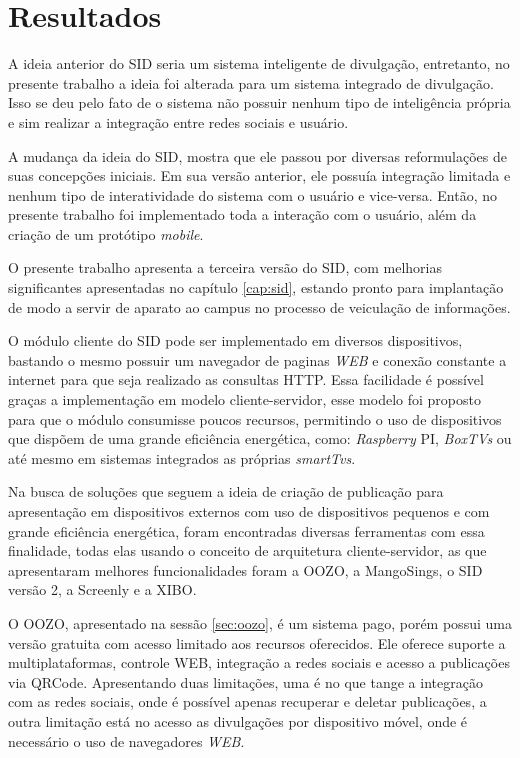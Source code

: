 \chapter[Resultados]{Resultados}
A ideia anterior do SID seria um sistema inteligente de divulgação, entretanto, no presente trabalho a ideia foi alterada para um sistema integrado de divulgação. Isso se deu pelo fato de o sistema não possuir nenhum tipo de inteligência própria e sim realizar a integração entre redes sociais e usuário.

A mudança da ideia do SID, mostra que ele passou por diversas reformulações de suas concepções iniciais. Em sua versão anterior, ele possuía integração limitada e nenhum tipo de interatividade do sistema com o usuário e vice-versa. Então, no presente trabalho foi implementado toda a interação com o usuário, além da criação de um protótipo \textit{mobile}.

O presente trabalho apresenta a terceira versão do SID, com melhorias significantes apresentadas no capítulo \ref{cap:sid}, estando pronto para implantação de modo a servir de aparato ao campus no processo de veiculação de informações.



O módulo cliente do SID pode ser implementado em diversos dispositivos, bastando o mesmo possuir um navegador de paginas \textit{WEB} e conexão constante a internet para que seja realizado as consultas HTTP. Essa facilidade é possível graças a implementação em modelo cliente-servidor, esse modelo foi proposto para que o módulo consumisse poucos recursos, permitindo o uso de dispositivos que dispõem de uma grande eficiência energética, como: \textit{Raspberry} PI, \textit{BoxTVs} ou até mesmo em sistemas integrados as próprias \textit{smartTvs}.


Na busca de soluções que seguem a ideia de criação de publicação para apresentação em dispositivos externos com uso de dispositivos pequenos e com grande eficiência energética, foram encontradas diversas ferramentas com essa finalidade, todas elas usando o conceito de arquitetura cliente-servidor, as que apresentaram melhores funcionalidades foram a OOZO, a MangoSings, o SID versão 2, a Screenly e a XIBO.

O OOZO, apresentado na sessão \ref{sec:oozo}, é um sistema pago, porém possui uma versão gratuita com acesso limitado aos recursos oferecidos. Ele oferece suporte a multiplataformas, controle WEB, integração a redes sociais e acesso a publicações via QRCode. Apresentando duas limitações, uma é no que tange a integração com as redes sociais, onde é possível apenas recuperar e deletar publicações, a outra limitação está no acesso as divulgações por dispositivo móvel, onde é necessário o uso de navegadores \textit{WEB}. 

